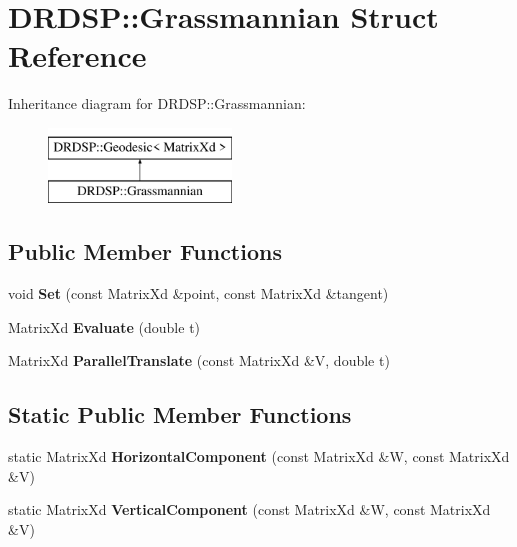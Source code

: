 \hypertarget{struct_d_r_d_s_p_1_1_grassmannian}{\section{D\-R\-D\-S\-P\-:\-:Grassmannian Struct Reference}
\label{struct_d_r_d_s_p_1_1_grassmannian}
}
Inheritance diagram for D\-R\-D\-S\-P\-:\-:Grassmannian\-:\begin{figure}[H]
\begin{center}
\leavevmode
\includegraphics[height=2.000000cm]{struct_d_r_d_s_p_1_1_grassmannian}
\end{center}
\end{figure}
\subsection*{Public Member Functions}
\begin{DoxyCompactItemize}
\item 
\hypertarget{struct_d_r_d_s_p_1_1_grassmannian_ae287de05dd2c87cc5a9bf3c3546e234b}{void {\bfseries Set} (const Matrix\-Xd \&point, const Matrix\-Xd \&tangent)}\label{struct_d_r_d_s_p_1_1_grassmannian_ae287de05dd2c87cc5a9bf3c3546e234b}

\item 
\hypertarget{struct_d_r_d_s_p_1_1_grassmannian_ab21eaf2cb5b01abe7801fa073179ef0c}{Matrix\-Xd {\bfseries Evaluate} (double t)}\label{struct_d_r_d_s_p_1_1_grassmannian_ab21eaf2cb5b01abe7801fa073179ef0c}

\item 
\hypertarget{struct_d_r_d_s_p_1_1_grassmannian_a7e6d630608028cf6738b24abbbf44ca4}{Matrix\-Xd {\bfseries Parallel\-Translate} (const Matrix\-Xd \&V, double t)}\label{struct_d_r_d_s_p_1_1_grassmannian_a7e6d630608028cf6738b24abbbf44ca4}

\end{DoxyCompactItemize}
\subsection*{Static Public Member Functions}
\begin{DoxyCompactItemize}
\item 
\hypertarget{struct_d_r_d_s_p_1_1_grassmannian_a0430d94764664fbeb8bd97e3d4514082}{static Matrix\-Xd {\bfseries Horizontal\-Component} (const Matrix\-Xd \&W, const Matrix\-Xd \&V)}\label{struct_d_r_d_s_p_1_1_grassmannian_a0430d94764664fbeb8bd97e3d4514082}

\item 
\hypertarget{struct_d_r_d_s_p_1_1_grassmannian_af3ba1867c912e3dc2418b12b54e1f4e5}{static Matrix\-Xd {\bfseries Vertical\-Component} (const Matrix\-Xd \&W, const Matrix\-Xd \&V)}\label{struct_d_r_d_s_p_1_1_grassmannian_af3ba1867c912e3dc2418b12b54e1f4e5}

\end{DoxyCompactItemize}
